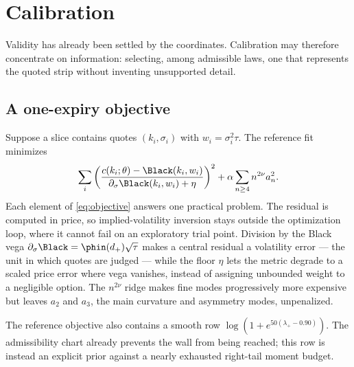 \section{Calibration}
\label{sec:calibration}

Validity has already been settled by the coordinates.  Calibration may
therefore concentrate on information: selecting, among admissible laws, one
that represents the quoted strip without inventing unsupported detail.

\subsection{A one-expiry objective}

Suppose a slice contains quotes $(k_i,\sigma_i)$ with
$w_i=\sigma_i^2\tau$.  The reference fit minimizes
\begin{equation}
\sum_i\left(
\frac{c(k_i;\theta)-\Black(k_i,w_i)}
     {\partial_\sigma\Black(k_i,w_i)+\eta}
\right)^2
+\alpha\sum_{n\ge4}n^{2\nu}a_n^2.
\label{eq:objective}
\end{equation}
Each element of \eqref{eq:objective} answers one practical problem.  The
residual is computed in price, so implied-volatility inversion stays outside
the optimization loop, where it cannot fail on an exploratory trial point.
Division by the Black vega $\partial_\sigma\Black=\phin(d_+)\sqrt\tau$ makes
a central residual a volatility error --- the unit in which quotes are
judged --- while the floor $\eta$ lets the metric degrade to a scaled price
error where vega vanishes, instead of assigning unbounded weight to a
negligible option.  The $n^{2\nu}$ ridge makes fine modes progressively more
expensive but leaves $a_2$ and $a_3$, the main curvature and asymmetry
modes, unpenalized.

The reference objective also contains a smooth row
$\log(1+e^{50(\lambda_+-0.90)})$.  The admissibility chart already prevents
the wall from being reached; this row is instead an explicit prior against a
nearly exhausted right-tail moment budget.

